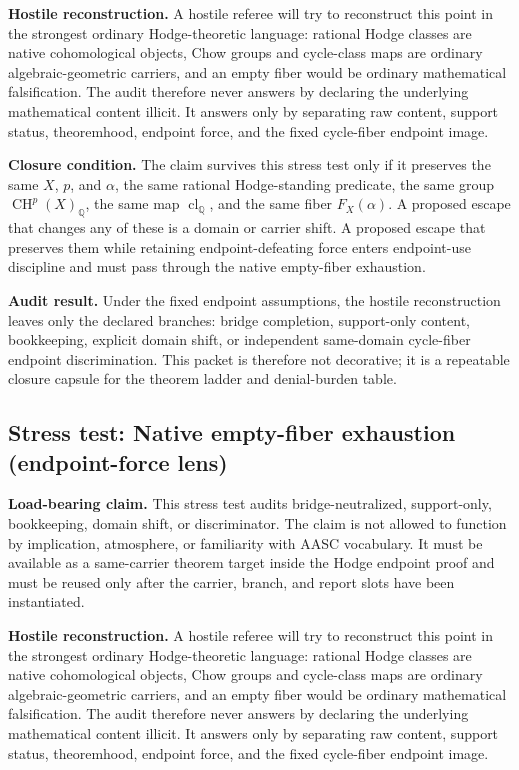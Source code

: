 \documentclass[11pt]{article}
\newcommand{\QQ}{\mathbb{Q}}
\newcommand{\CH}{\operatorname{CH}}
\newcommand{\clQ}{\operatorname{cl}_{\QQ}}
\begin{document}
\par\noindent\textbf{Hostile reconstruction.} A hostile referee will try to reconstruct this point in the strongest ordinary Hodge-theoretic language: rational Hodge classes are native cohomological objects, Chow groups and cycle-class maps are ordinary algebraic-geometric carriers, and an empty fiber would be ordinary mathematical falsification. The audit therefore never answers by declaring the underlying mathematical content illicit. It answers only by separating raw content, support status, theoremhood, endpoint force, and the fixed cycle-fiber endpoint image.

\par\noindent\textbf{Closure condition.} The claim survives this stress test only if it preserves the same $X$, $p$, and $\alpha$, the same rational Hodge-standing predicate, the same group $\CH^p(X)_\QQ$, the same map $\clQ$, and the same fiber $F_X(\alpha)$. A proposed escape that changes any of these is a domain or carrier shift. A proposed escape that preserves them while retaining endpoint-defeating force enters endpoint-use discipline and must pass through the native empty-fiber exhaustion.

\par\noindent\textbf{Audit result.} Under the fixed endpoint assumptions, the hostile reconstruction leaves only the declared branches: bridge completion, support-only content, bookkeeping, explicit domain shift, or independent same-domain cycle-fiber endpoint discrimination. This packet is therefore not decorative; it is a repeatable closure capsule for the theorem ladder and denial-burden table.


\subsection{Stress test: Native empty-fiber exhaustion (endpoint-force lens)}

\par\noindent\textbf{Load-bearing claim.} This stress test audits bridge-neutralized, support-only, bookkeeping, domain shift, or discriminator. The claim is not allowed to function by implication, atmosphere, or familiarity with AASC vocabulary. It must be available as a same-carrier theorem target inside the Hodge endpoint proof and must be reused only after the carrier, branch, and report slots have been instantiated.

\par\noindent\textbf{Hostile reconstruction.} A hostile referee will try to reconstruct this point in the strongest ordinary Hodge-theoretic language: rational Hodge classes are native cohomological objects, Chow groups and cycle-class maps are ordinary algebraic-geometric carriers, and an empty fiber would be ordinary mathematical falsification. The audit therefore never answers by declaring the underlying mathematical content illicit. It answers only by separating raw content, support status, theoremhood, endpoint force, and the fixed cycle-fiber endpoint image.
\end{document}

